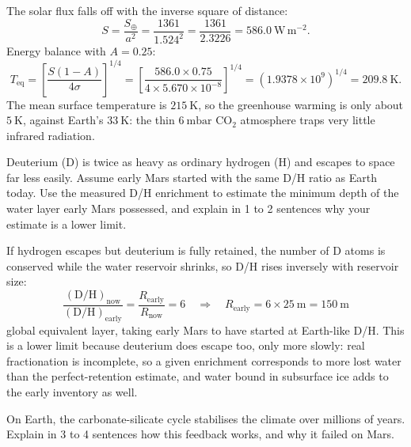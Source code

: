 \begin{solution}
The solar flux falls off with the inverse square of distance:
\[
  S = \frac{S_\oplus}{a^2} = \frac{1361}{1.524^2} = \frac{1361}{2.3226} = 586.0\ \mathrm{W\,m^{-2}}.
\]
Energy balance with $A = 0.25$:
\[
  T_{\mathrm{eq}} = \left[ \frac{S(1-A)}{4\sigma} \right]^{1/4}
                  = \left[ \frac{586.0 \times 0.75}{4 \times 5.670 \times 10^{-8}} \right]^{1/4}
                  = \left( 1.9378 \times 10^{9} \right)^{1/4} = 209.8\ \mathrm{K}.
\]
The mean surface temperature is $215\ \mathrm{K}$, so the greenhouse warming is only about $5\ \mathrm{K}$, against Earth's $33\ \mathrm{K}$: the thin $6\ \mathrm{mbar}$ $\mathrm{CO_2}$ atmosphere traps very little infrared radiation.
\end{solution}

\parti {} Deuterium (D) is twice as heavy as ordinary hydrogen (H) and escapes to space far less easily.
Assume early Mars started with the same D/H ratio as Earth today.
Use the measured D/H enrichment to estimate the minimum depth of the water layer early Mars possessed, and explain in 1 to 2 sentences why your estimate is a lower limit.

\begin{solution}
If hydrogen escapes but deuterium is fully retained, the number of D atoms is conserved while the water reservoir shrinks, so D/H rises inversely with reservoir size:
\[
  \frac{(\mathrm{D/H})_{\mathrm{now}}}{(\mathrm{D/H})_{\mathrm{early}}} = \frac{R_{\mathrm{early}}}{R_{\mathrm{now}}} = 6
  \quad \Longrightarrow \quad
  R_{\mathrm{early}} = 6 \times 25\ \mathrm{m} = 150\ \mathrm{m}
\]
global equivalent layer, taking early Mars to have started at Earth-like D/H.
This is a lower limit because deuterium does escape too, only more slowly: real fractionation is incomplete, so a given enrichment corresponds to more lost water than the perfect-retention estimate, and water bound in subsurface ice adds to the early inventory as well.
\end{solution}

\parti {} On Earth, the carbonate-silicate cycle stabilises the climate over millions of years.
Explain in 3 to 4 sentences how this feedback works, and why it failed on Mars.

